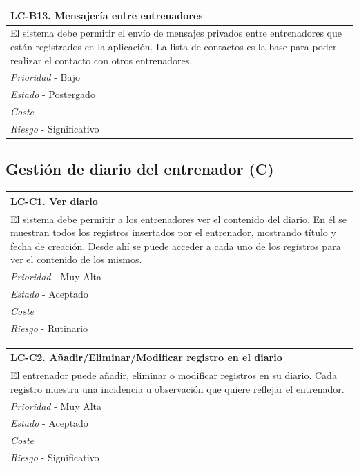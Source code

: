 	\begin{center}
		\begin{tabularx}{15cm}{|X|}
			\hline 
				\bf{LC-B13. Mensajería entre entrenadores}\\
			\hline
				El sistema debe permitir el envío de mensajes privados entre entrenadores que están registrados en la aplicación. La lista de contactos es la base para poder realizar el contacto con otros entrenadores.\\
			\hline
				{\it Prioridad} - Bajo\\
			\hline
				{\it Estado} - Postergado\\
			\hline
				{\it Coste}\\
			\hline
				{\it Riesgo} - Significativo\\
			\hline
		\end{tabularx}
	\end{center}

%
%
\subsection{Gestión de diario del entrenador (C)} %
	\label{sub:gestion_diario_entrenador}

	\begin{center}
		\begin{tabularx}{15cm}{|X|}
			\hline 
				\bf{LC-C1. Ver diario}\\
			\hline
				El sistema debe permitir a los entrenadores ver el contenido del diario. En él se muestran todos los registros insertados por el entrenador, mostrando título y fecha de creación. Desde ahí se puede acceder a cada uno de los registros para ver el contenido de los mismos.\\
			\hline
				{\it Prioridad} - Muy Alta\\
			\hline
				{\it Estado} - Aceptado\\
			\hline
				{\it Coste}\\
			\hline
				{\it Riesgo} - Rutinario\\
			\hline
		\end{tabularx}
	\end{center}
	
	\begin{center}
		\begin{tabularx}{15cm}{|X|}
			\hline 
				\bf{LC-C2. Añadir/Eliminar/Modificar registro en el diario}\\
			\hline
				El entrenador puede añadir, eliminar o modificar registros en su diario. Cada registro muestra una incidencia u observación que quiere reflejar el entrenador.\\
			\hline
				{\it Prioridad} - Muy Alta\\
			\hline
				{\it Estado} - Aceptado\\
			\hline
				{\it Coste}\\
			\hline
				{\it Riesgo} - Significativo\\
			\hline
		\end{tabularx}
	\end{center}
	
